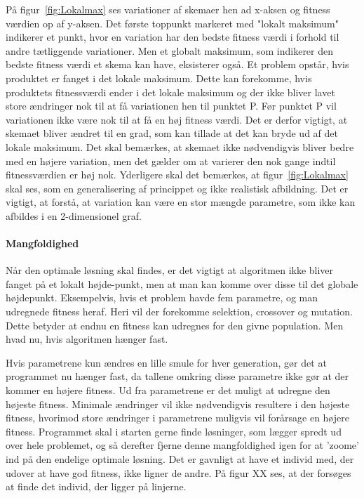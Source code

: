 På figur~\ref{fig:Lokalmax} ses variationer af skemaer hen ad x-aksen og fitness værdien op af y-aksen. Det første toppunkt markeret med "lokalt maksimum" indikerer et punkt, hvor en variation har den bedste fitness værdi i forhold til andre tætliggende variationer. Men et globalt maksimum, som indikerer den bedste fitness værdi et skema kan have, eksisterer også. Et problem opstår, hvis produktet er fanget i det lokale maksimum. Dette kan forekomme, hvis produktets fitnessværdi ender i det lokale maksimum og der ikke bliver lavet store ændringer nok til at få variationen hen til punktet P. Før punktet P vil variationen ikke være nok til at få en høj fitness værdi. Det er derfor vigtigt, at skemaet bliver ændret til en grad, som kan tillade at det kan bryde ud af det lokale maksimum. Det skal bemærkes, at skemaet ikke nødvendigvis bliver bedre med en højere variation, men det gælder om at varierer den nok gange indtil fitnessværdien er høj nok. Yderligere skal det bemærkes, at figur~\ref{fig:Lokalmax} skal ses, som en generalisering af princippet og ikke realistisk afbildning. Det er vigtigt, at forstå, at variation kan være en stor mængde parametre, som ikke kan afbildes i en 2-dimensionel graf.

\paragraph{Mangfoldighed}

Når den optimale løsning skal findes, er det vigtigt at algoritmen ikke bliver fanget på et lokalt højde-punkt, men at man kan komme over disse til det globale højdepunkt. Eksempelvis, hvis et problem havde fem parametre, og man udregnede fitness heraf. Heri vil der forekomme selektion, crossover og mutation. Dette betyder at endnu en fitness kan udregnes for den givne population. Men hvad nu, hvis algoritmen hænger fast. 

Hvis parametrene kun ændres en lille smule for hver generation, gør det at programmet nu hænger fast, da tallene omkring disse parametre ikke gør at der kommer en højere fitness. Ud fra parametrene er det muligt at udregne den højeste fitness. Minimale ændringer vil ikke nødvendigvis resultere i den højeste fitness, hvorimod store ændringer i parametrene muligvis vil forårsage en højere fitness. Programmet skal i starten gerne finde løsninger, som lægger spredt ud over hele problemet, og så derefter fjerne denne mangfoldighed igen for at ’zoome’ ind på den endelige optimale løsning. 
Det er gavnligt at have et individ med, der udover at have god fitness, ikke ligner de andre. På figur XX%
 ses, at der forsøges at finde det individ, der ligger på linjerne.

